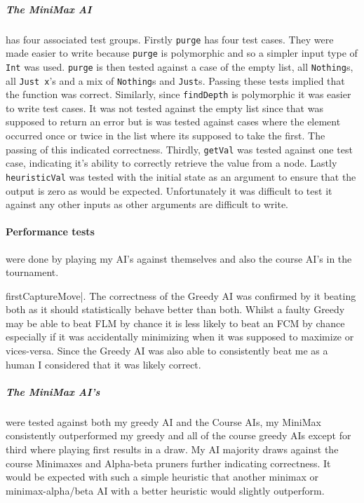 \documentclass[11pt]{article}
\begin{document}
\subparagraph{The MiniMax AI} has four associated test groups. Firstly \verb|purge| has four test cases. They were made easier to write because \verb|purge| is polymorphic and so a simpler input type of \verb|Int| was used. \verb|purge| is then tested against a case of the empty list, all \verb|Nothing|s, all \verb|Just x|'s and a mix of \verb|Nothing|s and \verb|Just|s. Passing these tests implied that the function was correct. Similarly, since \verb|findDepth| is polymorphic it was easier to write test cases. It was not tested against the empty list since that was supposed to return an error but is was tested against cases where the element occurred once or twice in the list where its supposed to take the first. The passing of this indicated correctness. Thirdly, \verb|getVal| was tested against one test case, indicating it's ability to correctly retrieve the value from a node. Lastly \verb|heuristicVal| was tested with the initial state as an argument to ensure that the output is zero as would be expected. Unfortunately it was difficult to test it against any other inputs as other arguments are difficult to write.

\paragraph{Performance tests} were done by playing my AI's against themselves and also the course AI's in the tournament.

firstCaptureMove|. The correctness of the Greedy AI was confirmed by it beating both as it should statistically behave better than both. Whilst a faulty Greedy may be able to beat FLM by chance it is less likely to beat an FCM by chance especially if it was accidentally minimizing when it was supposed to maximize or vices-versa. Since the Greedy AI was also able to consistently beat me as a human I considered that it was likely correct.

\subparagraph{The MiniMax AI's} were tested against both my greedy AI and the Course AIs, my MiniMax consistently outperformed my greedy and all of the course greedy AIs except for third where playing first results in a draw. My AI majority draws against the course Minimaxes and Alpha-beta pruners further indicating correctness. It would be expected with such a simple heuristic that another minimax or minimax-alpha/beta AI with a better heuristic would slightly outperform. 

\end{document}
